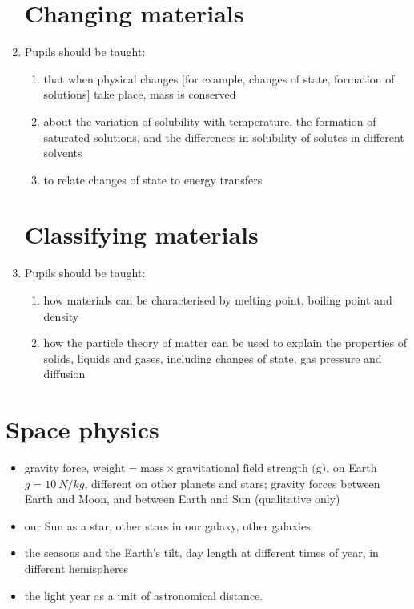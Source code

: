 \documentclass[10pt]{article}
\begin{document}
\begin{paracol}{2}
\begin{enumerate}
\section{Changing materials}
\setcounter{enumi}{1}
\item Pupils should be taught:
\begin{enumerate}
\subsection{Physical changes}
\item that when physical changes [for example, changes of state, formation
of solutions] take place, mass is conserved
\item about the variation of solubility with temperature, the formation of saturated
solutions, and the differences in solubility of solutes in different solvents
\item to relate changes of state to energy transfers
\end{enumerate}
\section{Classifying materials}
\setcounter{enumi}{0}
\item Pupils should be taught:
\begin{enumerate}
\subsection{Solids, liquids and gases}
\item how materials can be characterised by melting point, boiling point
and density
\item how the particle theory of matter can be used to explain the properties
of solids, liquids and gases, including changes of state, gas pressure
and diffusion
\end{enumerate}
\end{enumerate}

\switchcolumn*

\section{Space physics}
\begin{itemize}
\item gravity force, $\text{weight} = \text{mass}\times\text{gravitational field strength (g)}$, on Earth $g=\SI{10}{N/kg}$,
different on other planets and stars; gravity forces between Earth and Moon, and
between Earth and Sun (qualitative only)
\item our Sun as a star, other stars in our galaxy, other galaxies
\item the seasons and the Earth's tilt, day length at different times of year, in different
hemispheres
\item the light year as a unit of astronomical distance.
\end{itemize}


\end{paracol}
\end{document}
